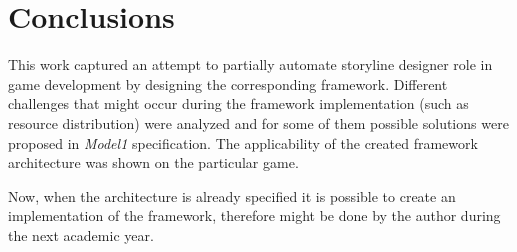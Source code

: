\chapter*{Conclusions}
This work captured an attempt to partially automate storyline designer role in game development by designing the corresponding framework. Different challenges that might occur during the framework implementation (such as resource distribution) were analyzed and for some of them possible solutions were proposed in \textit{Model1} specification. The applicability of the created framework architecture was shown on the particular game.

Now, when the architecture is already specified it is possible to create an implementation of the framework, therefore might be done by the author during the next academic year.

